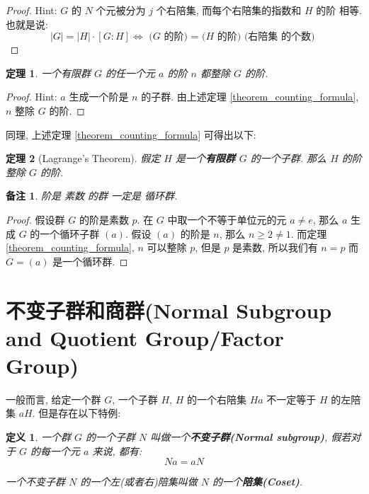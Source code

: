 \documentclass[utf8]{ctexbook}
\newtheorem{theorem}{定理}[section]
\newtheorem{definition}{定义}[section]
\newtheorem{memo}{备注}[section]
\begin{document}
\begin{proof}
Hint: $G$ 的 $N$ 个元被分为 $j$ 个右陪集, 而每个右陪集的指数和 $H$ 的阶 相等. 也就是说:
\begin{equation}
|G| = |H| \cdot [G : H] \iff \mbox{ ($G$ 的阶) = ($H$ 的阶) (右陪集 的个数) }  \nonumber
\end{equation}
\end{proof}

\begin{theorem}\label{theorem_finite_group_rank_divisable}
一个有限群 $G$ 的任一个元 $a$ 的阶 $n$ 都整除 $G$ 的阶.

\end{theorem}

\begin{proof}
Hint: $a$ 生成一个阶是 $n$ 的子群. 由上述定理 \ref{theorem_counting_formula}, $n$ 整除 $G$ 的阶.
\end{proof}

同理, 上述定理 \ref{theorem_counting_formula} 可得出以下:
\begin{theorem}[Lagrange’s Theorem]
假定 $H$ 是一个\textbf{有限群 $G$} 的一个子群. 那么 $H$ 的阶 整除 $G$ 的阶.
\end{theorem}


\begin{memo}\label{memo_prime_cyclic_group}
阶是 素数 的群 一定是 循环群.
\end{memo}

\begin{proof}
假设群 $G$ 的阶是素数 $p$. 在 $G$ 中取一个不等于单位元的元 $a \neq e$, 那么 $a$ 生成 $G$ 的一个循环子群 $(a)$. 假设 $(a)$ 的阶是 $n$, 那么 $n \geq 2 \neq 1$. 而定理 \ref{theorem_counting_formula}, $n$ 可以整除 $p$, 但是 $p$ 是素数, 所以我们有 $n=p$ 而 $G = (a)$ 是一个循环群. 
\end{proof}

\section{不变子群和商群(Normal Subgroup and Quotient Group/Factor Group)}

一般而言, 给定一个群 $G$, 一个子群 $H$, $H$ 的一个右陪集 $Ha$ 不一定等于 $H$ 的左陪集 $aH$. 但是存在以下特例:

\begin{definition}
一个群 $G$ 的一个子群 $N$ 叫做一个\textbf{不变子群(Normal subgroup)}, 假若对于 $G$ 的每一个元 $a$ 来说, 都有:
\begin{equation*}
Na = aN
\end{equation*}

一个不变子群 $N$ 的一个左(或者右)陪集叫做 $N$ 的一个\textbf{陪集(Coset)}.
\end{definition}
\end{document}

